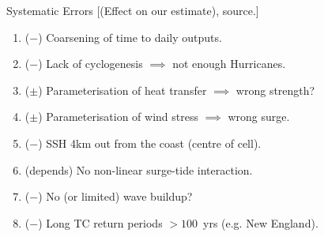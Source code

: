 \begin{frame}{Systematic Errors}
[(Effect on our estimate), source.]
\begin{enumerate}
\item ($-$) Coarsening of time to daily outputs.
\item ($-$) Lack of cyclogenesis  $\implies$ not enough Hurricanes.
\item ($\pm$) Parameterisation of heat transfer $\implies$ wrong strength?
\item ($\pm$) Parameterisation of wind stress $\implies$ wrong surge.
\item ($-$) SSH 4km out from the coast (centre of cell).
\item (depends) No non-linear surge-tide interaction.
\item ($-$) No (or limited) wave buildup?
\item ($-$) Long TC return periods $> 100$~yrs (e.g. New England).
\end{enumerate}

\end{frame}
